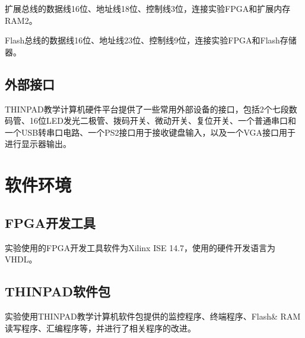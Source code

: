 扩展总线的数据线16位、地址线18位、控制线3位，连接实验FPGA和扩展内存RAM2。

Flash总线的数据线16位、地址线23位、控制线9位，连接实验FPGA和Flash存储器。


\subsection{外部接口}
THINPAD教学计算机硬件平台提供了一些常用外部设备的接口，包括2个七段数码管、16位LED发光二极管、拨码开关、微动开关、复位开关、一个普通串口和一个USB转串口电路、一个PS2接口用于接收键盘输入，以及一个VGA接口用于进行显示器输出。


\section{软件环境}

\subsection{FPGA开发工具}
实验使用的FPGA开发工具软件为Xilinx ISE 14.7，使用的硬件开发语言为VHDL。

\subsection{THINPAD软件包}
实验使用THINPAD教学计算机软件包提供的监控程序、终端程序、Flash\& RAM读写程序、汇编程序等，并进行了相关程序的改进。

